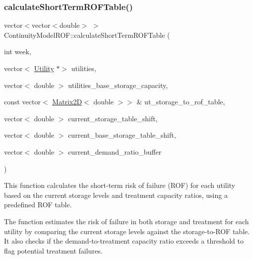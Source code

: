 \subsubsection{\texorpdfstring{calculate\+Short\+Term\+R\+O\+F\+Table()}{calculateShortTermROFTable()}}
{\footnotesize\ttfamily vector$<$vector$<$double$>$ $>$ Continuity\+Model\+R\+O\+F\+::calculate\+Short\+Term\+R\+O\+F\+Table (\begin{DoxyParamCaption}\item[{int}]{week,  }\item[{vector$<$ \mbox{\hyperlink{classUtility}{Utility}} $\ast$$>$}]{utilities,  }\item[{vector$<$ double $>$}]{utilities\+\_\+base\+\_\+storage\+\_\+capacity,  }\item[{const vector$<$ \mbox{\hyperlink{classMatrix2D}{Matrix2D}}$<$ double $>$$>$ \&}]{ut\+\_\+storage\+\_\+to\+\_\+rof\+\_\+table,  }\item[{vector$<$ double $>$}]{current\+\_\+storage\+\_\+table\+\_\+shift,  }\item[{vector$<$ double $>$}]{current\+\_\+base\+\_\+storage\+\_\+table\+\_\+shift,  }\item[{vector$<$ double $>$}]{current\+\_\+demand\+\_\+ratio\+\_\+buffer }\end{DoxyParamCaption})}



This function calculates the short-\/term risk of failure (R\+OF) for each utility based on the current storage levels and treatment capacity ratios, using a predefined R\+OF table. 

The function estimates the risk of failure in both storage and treatment for each utility by comparing the current storage levels against the storage-\/to-\/\+R\+OF table. It also checks if the demand-\/to-\/treatment capacity ratio exceeds a threshold to flag potential treatment failures.


